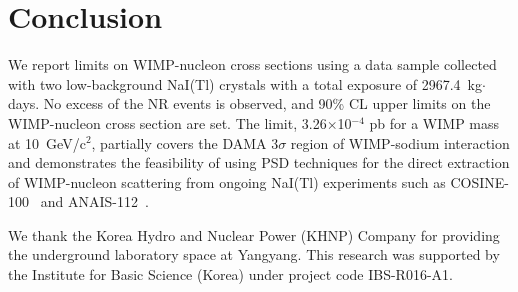 \documentclass[a4paper,11pt]{article}
\begin{document}
\section{Conclusion}
We report limits on WIMP-nucleon cross sections using a data sample collected with two low-background NaI(Tl) crystals with a total exposure of 2967.4~kg$\cdot$days.
No excess of the NR events is observed, and 90\% CL upper limits on the WIMP-nucleon cross section are set.
The limit, 3.26$\times$10$^{-4}$ pb for a WIMP mass at 10~GeV/c$^2$, partially covers the DAMA 3$\sigma$ region of WIMP-sodium interaction and demonstrates the feasibility of using PSD techniques for the direct extraction of WIMP-nucleon scattering from ongoing NaI(Tl) experiments such as COSINE-100~\cite{cosine_set1} and ANAIS-112~\cite{Amare:2018sxx}.

\acknowledgments
We thank the Korea Hydro and Nuclear Power (KHNP) Company for providing the underground laboratory space at Yangyang.
This research was supported by the Institute for Basic Science (Korea) under project code IBS-R016-A1.















\end{document}
